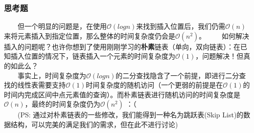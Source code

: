\documentclass{beamer}
\begin{document}
	\begin{frame}\frametitle{思考题}
	\ \ \ \ 但一个明显的问题是，在使用$\mathcal{O}(logn)$来找到插入位置后，我们仍需$\mathcal{O}(n)$来将元素插入到指定位置，那么整体的时间复杂度仍会是$\mathcal{O}(n^2)$。
	\ \ \ \ 如何解决插入的问题呢？也许你想到了使用刚刚学习的\textbf{朴素}链表（单向，双向链表）：在已知插入位置的情况下，链表插入一个元素的时间复杂度为$\mathcal{O}(1)$，问题解决！但真的如此么？\\
	\ \ \ \ 事实上，时间复杂度为$\mathcal{O}(logn)$的二分查找隐含了一个前提，即进行二分查找的线性表需要支持$\mathcal{O}(1)$时间复杂度的随机访问（一个更弱的前提是在$\mathcal{O}(1)$的时间内完成区间中点元素值的查询）。而朴素链表进行随机访问的时间复杂度是$\mathcal{O}(n)$，最终的时间复杂度仍为$\mathcal{O}(n^2)$ ：（
	\ \ \ \ \\
	\ \ \ \ (PS: 通过对朴素链表的一些修改，我们能得到一种名为跳跃表(Skip List)的数据结构，可以完美的满足我们的需求，但在此不进行讨论)
	\end{frame}
\end{document}
